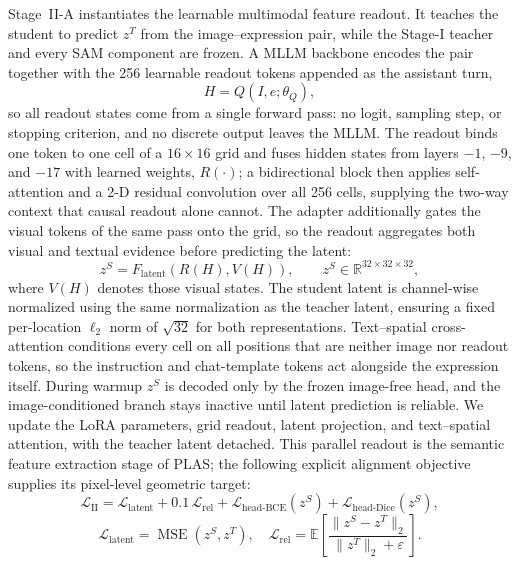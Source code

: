 Stage~II-A instantiates the learnable multimodal feature readout. It teaches the student to predict $z^T$ from the image--expression pair, while the Stage-I teacher and every SAM component are frozen. A MLLM backbone \cite{Bai2025Qwen3VL,Liu2023LLaVA} encodes the pair together with the 256 learnable readout tokens appended as the assistant turn,
\begin{equation}
  H=Q(I,e;\theta_Q),
  \label{eq:student_hidden}
\end{equation}
so all readout states come from a single forward pass: no logit, sampling step, or stopping criterion, and no discrete output leaves the MLLM. The readout binds one token to one cell of a $16\times16$ grid and fuses hidden states from layers $-1$, $-9$, and $-17$ with learned weights, $R(\cdot)$; a bidirectional block then applies self-attention and a 2-D residual convolution over all 256 cells, supplying the two-way context that causal readout alone cannot. The adapter additionally gates the visual tokens of the same pass onto the grid, so the readout aggregates both visual and textual evidence before predicting the latent:
\begin{equation}
  z^S=F_{\mathrm{latent}}\!\left(R(H),V(H)\right), \qquad
  z^S\in\mathbb{R}^{32\times32\times32},
  \label{eq:student_latent}
\end{equation}
where $V(H)$ denotes those visual states. The student latent is channel-wise normalized
using the same normalization as the teacher latent,
ensuring a fixed per-location $\ell_2$ norm of
$\sqrt{32}$ for both representations. Text--spatial cross-attention conditions every cell on all positions that are neither image nor readout tokens, so the instruction and chat-template tokens act alongside the expression itself. During warmup $z^S$ is decoded only by the frozen image-free head, and the image-conditioned branch stays inactive until latent prediction is reliable. We update the LoRA parameters, grid readout, latent projection, and text--spatial attention, with the teacher latent detached. This parallel readout is the semantic feature extraction stage of PLAS; the following explicit alignment objective supplies its pixel-level geometric target:
\begin{equation}
  \mathcal{L}_{\mathrm{II}}=
  \mathcal{L}_{\mathrm{latent}}+0.1\,\mathcal{L}_{\mathrm{rel}}
  +\mathcal{L}_{\mathrm{head\text{-}BCE}}(z^S)
  +\mathcal{L}_{\mathrm{head\text{-}Dice}}(z^S),
  \label{eq:stage2_loss}
\end{equation}
\begin{equation}
  \mathcal{L}_{\mathrm{latent}}=\operatorname{MSE}(z^S,z^T), \quad
\mathcal{L}_{\mathrm{rel}}=\mathbb{E}\!\left[
  \frac{\lVert z^S-z^T\rVert_2}{\lVert z^T\rVert_2+\varepsilon}\right].
\label{eq:alignment_losses}
\end{equation}

